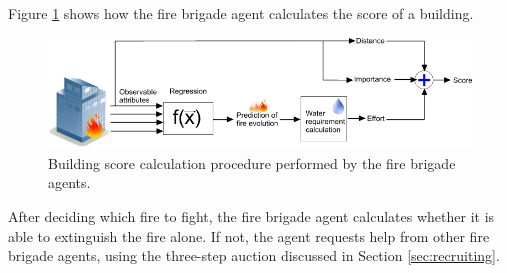 Figure \ref{fig:firebrigade} shows how the fire brigade agent calculates the score of a building.

\begin{figure}[!ht]
     \centering
     \includegraphics[width=12cm]{img/firebrigade.png}
     \caption{Building score calculation procedure performed by the fire brigade agents.}
     \label{fig:firebrigade}
\end{figure}


After deciding which fire to fight, the fire brigade agent calculates whether it is able to extinguish the fire alone. If not, the agent requests help from other fire brigade agents, using the three-step auction discussed in Section \ref{sec:recruiting}.
